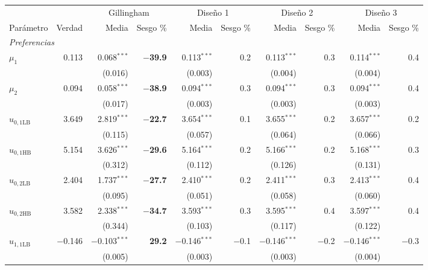 \begin{table}[htbp]
\centering
\small
\setlength{\tabcolsep}{4.5pt}
\begin{adjustbox}{max width=\textwidth}
\begin{tabular}{l r rr rr rr rr}
\toprule
 & & \multicolumn{2}{c}{Gillingham} & \multicolumn{2}{c}{Diseño 1} & \multicolumn{2}{c}{Diseño 2} & \multicolumn{2}{c}{Diseño 3}\\
\cmidrule(lr){3-4} \cmidrule(lr){5-6} \cmidrule(lr){7-8} \cmidrule(lr){9-10}
Parámetro & Verdad & Media & Sesgo \% & Media & Sesgo \% & Media & Sesgo \% & Media & Sesgo \%\\
\midrule
\multicolumn{10}{l}{\textit{Preferencias}}\\
$\mu_{1}$ & 0.113 & 0.068$^{***}$ & \textbf{$-$39.9} & 0.113$^{***}$ & 0.2 & 0.113$^{***}$ & 0.3 & 0.114$^{***}$ & 0.4\\
 &  & (0.016) &  & (0.003) &  & (0.004) &  & (0.004) & \\[1pt]
$\mu_{2}$ & 0.094 & 0.058$^{***}$ & \textbf{$-$38.9} & 0.094$^{***}$ & 0.3 & 0.094$^{***}$ & 0.3 & 0.094$^{***}$ & 0.4\\
 &  & (0.017) &  & (0.003) &  & (0.003) &  & (0.003) & \\[1pt]
$u_{0,1\text{LB}}$ & 3.649 & 2.819$^{***}$ & \textbf{$-$22.7} & 3.654$^{***}$ & 0.1 & 3.655$^{***}$ & 0.2 & 3.657$^{***}$ & 0.2\\
 &  & (0.115) &  & (0.057) &  & (0.064) &  & (0.066) & \\[1pt]
$u_{0,1\text{HB}}$ & 5.154 & 3.626$^{***}$ & \textbf{$-$29.6} & 5.164$^{***}$ & 0.2 & 5.166$^{***}$ & 0.2 & 5.168$^{***}$ & 0.3\\
 &  & (0.312) &  & (0.112) &  & (0.126) &  & (0.131) & \\[1pt]
$u_{0,2\text{LB}}$ & 2.404 & 1.737$^{***}$ & \textbf{$-$27.7} & 2.410$^{***}$ & 0.2 & 2.411$^{***}$ & 0.3 & 2.413$^{***}$ & 0.4\\
 &  & (0.095) &  & (0.051) &  & (0.058) &  & (0.060) & \\[1pt]
$u_{0,2\text{HB}}$ & 3.582 & 2.338$^{***}$ & \textbf{$-$34.7} & 3.593$^{***}$ & 0.3 & 3.595$^{***}$ & 0.4 & 3.597$^{***}$ & 0.4\\
 &  & (0.344) &  & (0.103) &  & (0.117) &  & (0.122) & \\[1pt]
$u_{1,1\text{LB}}$ & $-$0.146 & $-$0.103$^{***}$ & \textbf{29.2} & $-$0.146$^{***}$ & $-$0.1 & $-$0.146$^{***}$ & $-$0.2 & $-$0.146$^{***}$ & $-$0.3\\
 &  & (0.005) &  & (0.003) &  & (0.003) &  & (0.004) & \\[1pt]

\end{tabular}
\end{adjustbox}
\end{table}
